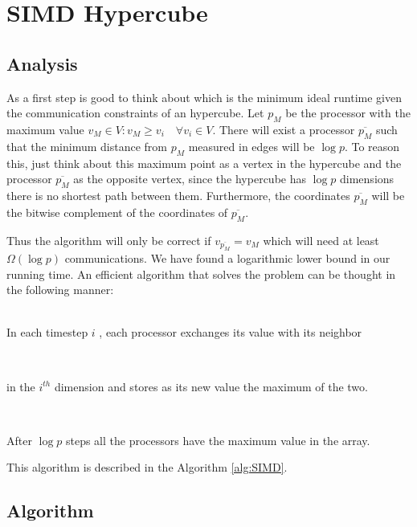 \documentclass[a4paper]{article}
\begin{document}
\section{SIMD Hypercube}
    \subsection{Analysis}
        As a first step is good to think about which is the minimum ideal runtime given the communication constraints of an hypercube. Let $p_M$ be the processor with the maximum value $v_M \in V : v_M \geq v_i \quad\forall v_i \in V$. There will exist a processor $\overline{p_M}$ such that the minimum distance from $p_M$ measured in edges will be $\log p$. To reason this, just think about this maximum point as a vertex in the hypercube and the processor $\overline{p_M}$ as the opposite vertex, since the hypercube has $\log p$ dimensions there is no shortest path between them. Furthermore, the coordinates $\overline{p_M}$ will be the bitwise complement of the coordinates of $\overline{p_M}$.

        Thus the algorithm will only be correct if $v_{\overline{p_M}} = v_M$ which will need at least $\Omega(\log p)$ communications. We have found a logarithmic lower bound in our running time. An efficient algorithm that solves the problem can be thought in the following manner:\\\,\\
        \centerline{
        {   In each timestep $i$ , each processor exchanges its value with its neighbor \phantom{a} }}\\\centerline{{ in the $i^{th}$ dimension and stores as its new value the maximum of the two.\phantom{}}}\\
        \centerline{ {After $\log p$ steps all the processors have the maximum value in the array.}
        }

        This algorithm is described in the Algorithm \ref{alg:SIMD}.

    \subsection{Algorithm}
\end{document}
